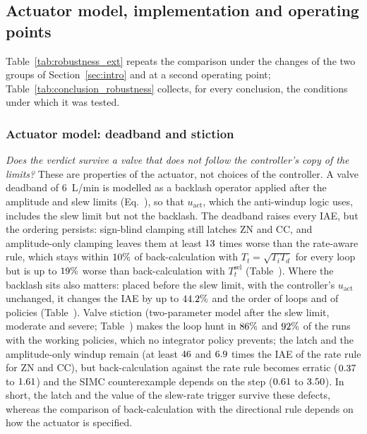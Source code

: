 \subsection{Actuator model, implementation and operating points}
\label{subsec:robustness_ext}
Table~\ref{tab:robustness_ext} repeats the comparison under the changes of the two groups of Section~\ref{sec:intro} and at a second operating point; Table~\ref{tab:conclusion_robustness} collects, for every conclusion, the conditions under which it was tested.

\subsubsection{Actuator model: deadband and stiction}
\label{subsubsec:actuator_model}
\emph{Does the verdict survive a valve that does not follow the controller's copy of the limits?} These are properties of the actuator, not choices of the controller. A valve deadband of $6$~L/min is modelled as a backlash operator applied after the amplitude and slew limits (Eq.~), so that $u_{\text{act}}$, which the anti-windup logic uses, includes the slew limit but not the backlash. The deadband raises every IAE, but the ordering persists: sign-blind clamping still latches ZN and CC, and amplitude-only clamping leaves them at least $13$ times worse than the rate-aware rule, which stays within $10\%$ of back-calculation with $T_t = \sqrt{T_iT_d}$ for every loop but is up to $19\%$ worse than back-calculation with $T_t^{\mathrm{sel}}$ (Table~). Where the backlash sits also matters: placed before the slew limit, with the controller's $u_{\text{act}}$ unchanged, it changes the IAE by up to $44.2\%$ and the order of loops and of policies (Table~). Valve stiction (two-parameter model \cite{choudhury2005modelling} after the slew limit, moderate and severe; Table~) makes the loop hunt in $86\%$ and $92\%$ of the runs with the working policies, which no integrator policy prevents; the latch and the amplitude-only windup remain (at least $46$ and $6.9$ times the IAE of the rate rule for ZN and CC), but back-calculation against the rate rule becomes erratic ($0.37$ to $1.61$) and the SIMC counterexample depends on the step ($0.61$ to $3.50$). In short, the latch and the value of the slew-rate trigger survive these defects, whereas the comparison of back-calculation with the directional rule depends on how the actuator is specified.

